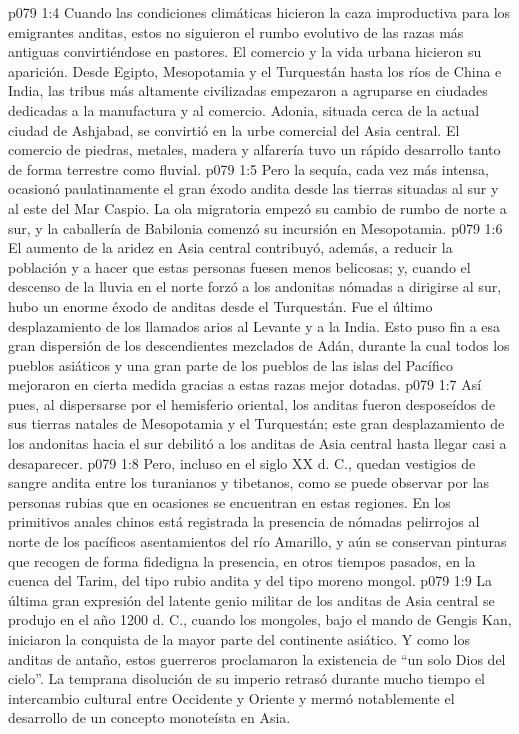 \vs p079 1:4 Cuando las condiciones climáticas hicieron la caza improductiva para los emigrantes anditas, estos no siguieron el rumbo evolutivo de las razas más antiguas convirtiéndose en pastores. El comercio y la vida urbana hicieron su aparición. Desde Egipto, Mesopotamia y el Turquestán hasta los ríos de China e India, las tribus más altamente civilizadas empezaron a agruparse en ciudades dedicadas a la manufactura y al comercio. Adonia, situada cerca de la actual ciudad de Ashjabad, se convirtió en la urbe comercial del Asia central. El comercio de piedras, metales, madera y alfarería tuvo un rápido desarrollo tanto de forma terrestre como fluvial.
\vs p079 1:5 Pero la sequía, cada vez más intensa, ocasionó paulatinamente el gran éxodo andita desde las tierras situadas al sur y al este del Mar Caspio. La ola migratoria empezó su cambio de rumbo de norte a sur, y la caballería de Babilonia comenzó su incursión en Mesopotamia.
\vs p079 1:6 El aumento de la aridez en Asia central contribuyó, además, a reducir la población y a hacer que estas personas fuesen menos belicosas; y, cuando el descenso de la lluvia en el norte forzó a los andonitas nómadas a dirigirse al sur, hubo un enorme éxodo de anditas desde el Turquestán. Fue el último desplazamiento de los llamados arios al Levante y a la India. Esto puso fin a esa gran dispersión de los descendientes mezclados de Adán, durante la cual todos los pueblos asiáticos y una gran parte de los pueblos de las islas del Pacífico mejoraron en cierta medida gracias a estas razas mejor dotadas.
\vs p079 1:7 Así pues, al dispersarse por el hemisferio oriental, los anditas fueron desposeídos de sus tierras natales de Mesopotamia y el Turquestán; este gran desplazamiento de los andonitas hacia el sur debilitó a los anditas de Asia central hasta llegar casi a desaparecer.
\vs p079 1:8 Pero, incluso en el siglo XX d. C., quedan vestigios de sangre andita entre los turanianos y tibetanos, como se puede observar por las personas rubias que en ocasiones se encuentran en estas regiones. En los primitivos anales chinos está registrada la presencia de nómadas pelirrojos al norte de los pacíficos asentamientos del río Amarillo, y aún se conservan pinturas que recogen de forma fidedigna la presencia, en otros tiempos pasados, en la cuenca del Tarim, del tipo rubio andita y del tipo moreno mongol.
\vs p079 1:9 La última gran expresión del latente genio militar de los anditas de Asia central se produjo en el año 1200 d. C., cuando los mongoles, bajo el mando de Gengis Kan, iniciaron la conquista de la mayor parte del continente asiático. Y como los anditas de antaño, estos guerreros proclamaron la existencia de “un solo Dios del cielo”. La temprana disolución de su imperio retrasó durante mucho tiempo el intercambio cultural entre Occidente y Oriente y mermó notablemente el desarrollo de un concepto monoteísta en Asia.
